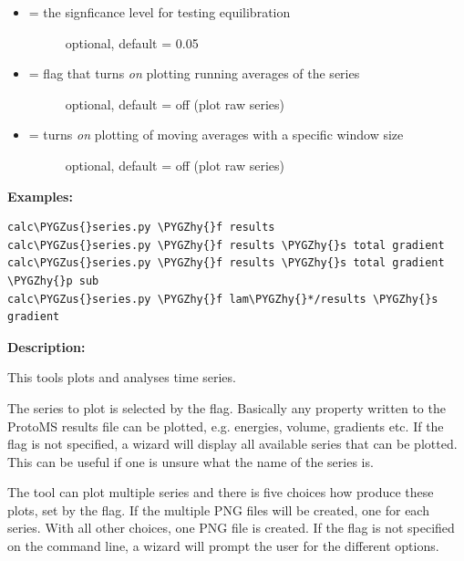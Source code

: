 \documentclass[letterpaper,10pt,english]{sphinxmanual}
\def\PYGZus{\char`\_}
\def\PYGZhy{\char`\-}
\begin{document}
\begin{itemize}
\item {} \begin{description}
\item[{ = the signficance level for testing equilibration}] \leavevmode
optional, default = 0.05

\end{description}

\item {} \begin{description}
\item[{ = flag that turns \emph{on} plotting running averages of the series}] \leavevmode
optional, default = off (plot raw series)

\end{description}

\item {} \begin{description}
\item[{ = turns \emph{on} plotting of moving averages with a specific window size}] \leavevmode
optional, default = off (plot raw series)

\end{description}

\end{itemize}

\textbf{Examples:}

\begin{Verbatim}[commandchars=\\\{\}]
calc\PYGZus{}series.py \PYGZhy{}f results
calc\PYGZus{}series.py \PYGZhy{}f results \PYGZhy{}s total gradient
calc\PYGZus{}series.py \PYGZhy{}f results \PYGZhy{}s total gradient \PYGZhy{}p sub
calc\PYGZus{}series.py \PYGZhy{}f lam\PYGZhy{}*/results \PYGZhy{}s gradient
\end{Verbatim}

\textbf{Description:}

This tools plots and analyses time series.

The series to plot is selected by the  flag. Basically any property written to the ProtoMS results file can be plotted, e.g. energies, volume, gradients etc. If the  flag is not specified, a wizard will display all available series that can be plotted. This can be useful if one is unsure what the name of the series is.

The tool can plot multiple series and there is five choices how produce these plots, set by the  flag. If the  multiple PNG files will be created, one for each series. With all other choices, one PNG file is created. If the  flag is not specified on the command line, a wizard will prompt the user for the different options.
\end{document}
